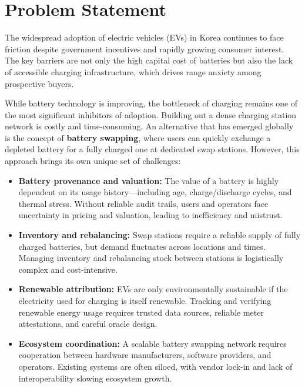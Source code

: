 \documentclass[12pt,a4paper]{article}
\begin{document}
\section{Problem Statement}

The widespread adoption of electric vehicles (EVs) in Korea continues to face friction despite government incentives and rapidly growing consumer interest. The key barriers are not only the high capital cost of batteries but also the lack of accessible charging infrastructure, which drives range anxiety among prospective buyers. 

While battery technology is improving, the bottleneck of charging remains one of the most significant inhibitors of adoption. Building out a dense charging station network is costly and time-consuming. An alternative that has emerged globally is the concept of \textbf{battery swapping}, where users can quickly exchange a depleted battery for a fully charged one at dedicated swap stations. However, this approach brings its own unique set of challenges:

\begin{itemize}[leftmargin=1.5em]
    \item \textbf{Battery provenance and valuation:} The value of a battery is highly dependent on its usage history---including age, charge/discharge cycles, and thermal stress. Without reliable audit trails, users and operators face uncertainty in pricing and valuation, leading to inefficiency and mistrust.
    
    \item \textbf{Inventory and rebalancing:} Swap stations require a reliable supply of fully charged batteries, but demand fluctuates across locations and times. Managing inventory and rebalancing stock between stations is logistically complex and cost-intensive.
    
    \item \textbf{Renewable attribution:} EVs are only environmentally sustainable if the electricity used for charging is itself renewable. Tracking and verifying renewable energy usage requires trusted data sources, reliable meter attestations, and careful oracle design.
    
    \item \textbf{Ecosystem coordination:} A scalable battery swapping network requires cooperation between hardware manufacturers, software providers, and operators. Existing systems are often siloed, with vendor lock-in and lack of interoperability slowing ecosystem growth.
\end{itemize}
\end{document}
